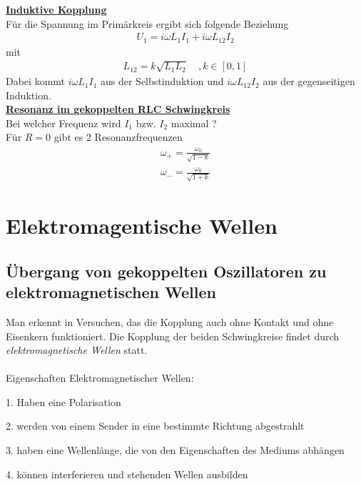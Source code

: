 \documentclass[a4paper,12pt]{report}
\begin{document}
\underline{\textbf{Induktive Kopplung}} \\
Für die Spannung im Primärkreis ergibt sich folgende Beziehung 
\begin{align}
U_1 = i\omega L_1I_1 + i\omega L_{12}I_2 
\end{align}
mit 
\begin{align}
L_{12} = k\sqrt{L_1L_2}  \quad  , k \in [0,1]
\end{align}
Dabei kommt  $i\omega L_1I_1$ aus der Selbstinduktion und $i\omega L_{12}I_2$ aus der gegenseitigen Induktion.  \\

\underline{\textbf{Resonanz im gekoppelten RLC Schwingkreis}} \\
Bei welcher Frequenz wird $I_1$ bzw. $I_2$ maximal ? \\
Für $R = 0$ gibt es 2 Resonanzfrequenzen
\begin{align}
\omega_+ = \frac{\omega_0}{\sqrt{1-k}} \\
\omega_- = \frac{\omega_0}{\sqrt{1+k}}
\end{align}




\section{Elektromagentische Wellen}
\subsection{Übergang von gekoppelten Oszillatoren zu elektromagnetischen Wellen}

Man erkennt in Versuchen, das die Kopplung auch ohne Kontakt und ohne Eisenkern funktioniert. Die Kopplung der beiden Schwingkreise findet durch \textit{elektromagnetische Wellen} statt. 
\\ \\
Eigenschaften Elektromagnetischer Wellen:
\begin{description}
\item 1. Haben eine Polarisation
\item 2. werden von einem Sender in eine bestimmte Richtung abgestrahlt
\item 3. haben eine Wellenlänge, die von den Eigenschaften des Mediums abhängen
\item 4. können interferieren und stehenden Wellen ausbilden
\end{description}
\end{document}
